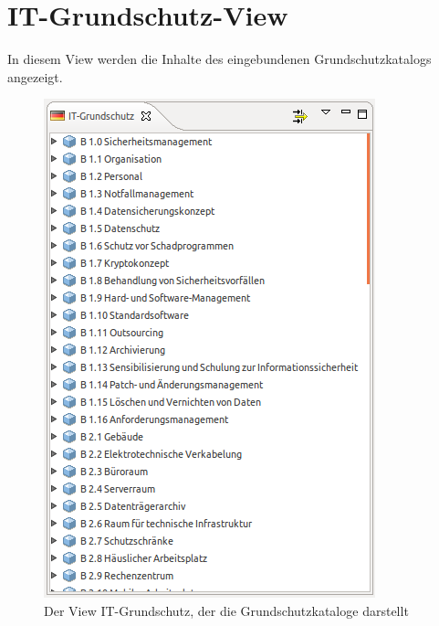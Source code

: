 \documentclass[a4paper,10pt]{book}
\begin{document}
\section{IT-Grundschutz-View}
In diesem View werden die Inhalte des eingebundenen Grundschutzkatalogs angezeigt.
\newline
\begin{figure}[htb!]
  \centering
  \includegraphics[scale=.7]{Screenshot/IT-Grundschutz-View.png}
  \caption{\label{Der View IT-Grundschutz, der die Grundschutzkataloge darstellt} Der View IT-Grundschutz, der die Grundschutzkataloge darstellt}
\end{figure}
\newline
\end{document}
